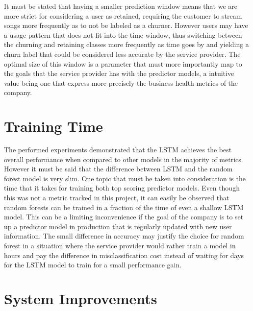\documentclass{kththesis}
\begin{document}
It must be stated that having a smaller prediction window means that we are more strict for considering a user as retained, requiring the customer to stream songs more frequently as to not be labeled as a churner. However users may have a usage pattern that does not fit into the time window, thus switching between the churning and retaining classes more frequently as time goes by and yielding a churn label that could be considered less accurate by the service provider. The optimal size of this window is a parameter that must more importantly map to the goals that the service provider has with the predictor models, a intuitive value being one that express more precisely the business health metrics of the company.

\section{Training Time}

The performed experiments demonstrated that the LSTM achieves the best overall performance when compared to other models in the majority of metrics. However it must be said that the difference between LSTM and the random forest model is very slim. One topic that must be taken into consideration is the time that it takes for training both top scoring predictor models. Even though this was not a metric tracked in this project, it can easily be observed that random forests can be trained in a fraction of the time of even a shallow LSTM model. This can be a limiting inconvenience if the goal of the company is to set up a predictor model in production that is regularly updated with new user information. The small difference in accuracy may justify the choice for random forest in a situation where the service provider would rather train a model in hours and pay the difference in misclassification cost instead of waiting for days for the LSTM model to train for a small performance gain. 

\section{System Improvements}
\end{document}
